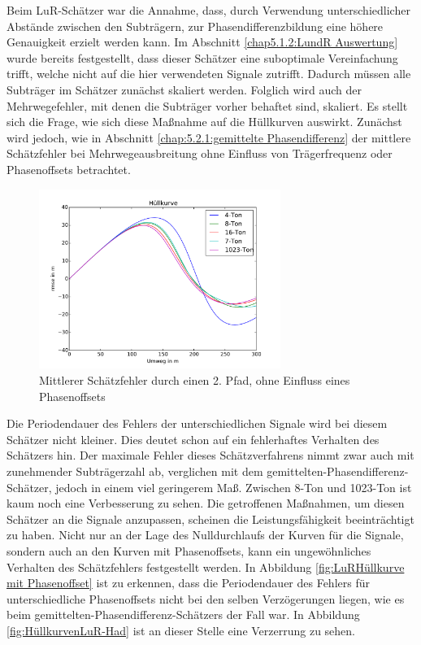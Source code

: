 Beim \gls{LuR}-Schätzer war die Annahme, dass, durch Verwendung unterschiedlicher Abstände zwischen den Subträgern, zur Phasendifferenzbildung eine höhere Genauigkeit erzielt werden kann. Im Abschnitt \ref{chap5.1.2:LundR Auswertung} wurde bereits festgestellt, dass dieser Schätzer eine suboptimale Vereinfachung trifft, welche nicht auf die hier verwendeten Signale zutrifft. Dadurch müssen alle Subträger im Schätzer zunächst skaliert werden. Folglich wird auch der Mehrwegefehler, mit denen die Subträger vorher behaftet sind, skaliert. Es stellt sich die Frage, wie sich diese Maßnahme auf die Hüllkurven auswirkt. Zunächst wird jedoch, wie in Abschnitt \ref{chap:5.2.1:gemittelte Phasendifferenz} der mittlere Schätzfehler bei Mehrwegeausbreitung ohne Einfluss von Trägerfrequenz oder Phasenoffsets betrachtet.
 
\begin{figure}[htbp]
	\centering
	\includegraphics[width = 0.7\textwidth]{images/LuR_Huellkurve_ohne_Traeger}
	\caption{Mittlerer Schätzfehler durch einen 2. Pfad, ohne Einfluss eines Phasenoffsets}
	\label{fig:LuRHullkurveBasisband}
\end{figure}

Die Periodendauer des Fehlers der unterschiedlichen Signale wird bei diesem Schätzer nicht kleiner. Dies deutet schon auf ein fehlerhaftes Verhalten des Schätzers hin. 
Der maximale Fehler dieses Schätzverfahrens nimmt zwar auch mit zunehmender Subträgerzahl ab, verglichen mit dem gemittelten-Phasendifferenz-Schätzer, jedoch in einem viel geringerem Maß. Zwischen 8-Ton und 1023-Ton ist kaum noch eine Verbesserung zu sehen. Die getroffenen Maßnahmen, um diesen Schätzer an die Signale anzupassen, scheinen die Leistungsfähigkeit beeinträchtigt zu haben. Nicht nur an der Lage des Nulldurchlaufs der Kurven für die Signale, sondern auch an den Kurven mit Phasenoffsets, kann ein ungewöhnliches Verhalten des Schätzfehlers festgestellt werden. In Abbildung \ref{fig:LuRHüllkurve mit Phasenoffset} ist zu erkennen, dass die Periodendauer des Fehlers für unterschiedliche Phasenoffsets nicht bei den selben Verzögerungen liegen, wie es beim gemittelten-Phasendifferenz-Schätzers der Fall war. In Abbildung \ref{fig:HüllkurvenLuR-Had} ist an dieser Stelle eine Verzerrung zu sehen.

